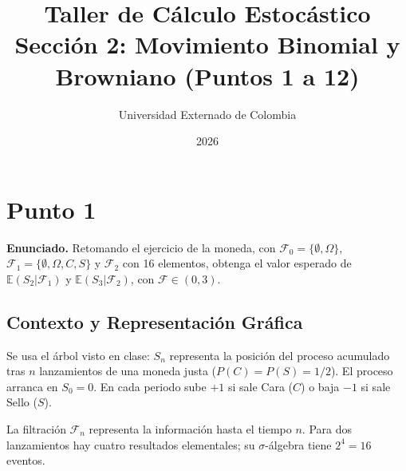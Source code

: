 \documentclass[11pt, a4paper]{article}
\title{\textbf{Taller de Cálculo Estocástico}\\ \large Sección 2: Movimiento Binomial y Browniano (Puntos 1 a 12)}
\author{Universidad Externado de Colombia}
\date{2026}
\begin{document}
\maketitle

\section*{Punto 1}
\textbf{Enunciado.} Retomando el ejercicio de la moneda, con $\mathcal{F}_{0}=\{\emptyset,\Omega\}$, $\mathcal{F}_{1}=\{\emptyset,\Omega,C,S\}$ y $\mathcal{F}_{2}$ con 16 elementos, obtenga el valor esperado de $\mathbb{E}(S_{2}|\mathcal{F}_{1})$ y $\mathbb{E}(S_{3}|\mathcal{F}_{2})$, con $\mathcal{F}\in(0,3)$.

\subsection*{Contexto y Representación Gráfica}
Se usa el árbol visto en clase: $S_n$ representa la posición del proceso acumulado tras $n$ lanzamientos de una moneda justa ($P(C)=P(S)=1/2$). El proceso arranca en $S_0=0$. En cada periodo sube $+1$ si sale Cara ($C$) o baja $-1$ si sale Sello ($S$). 

La filtración \(\mathcal{F}_n\) representa la información hasta el tiempo \(n\). Para dos lanzamientos hay cuatro resultados elementales; su \(\sigma\)-álgebra tiene \(2^4=16\) eventos.
\end{document}
